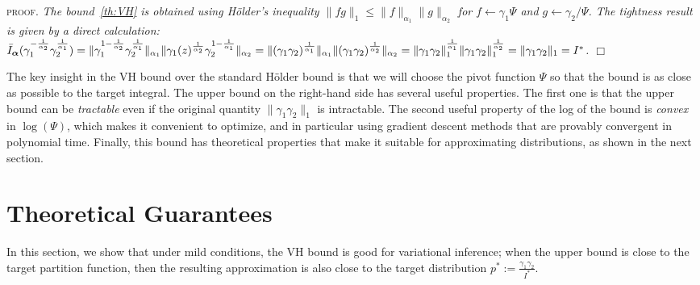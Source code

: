 \documentclass{article} %
\newcommand{\Holder}{H\"older\xspace}
\def\z{z}
\def\proba{p}
\newenvironment{proof}{\textsc{proof.}\it}{\hfill{$\Box$}}
\begin{document}
\begin{proof}
The bound~\eqref{th:VH} is obtained using \Holder's inequality $\|fg\|_1\le\|f\|_{\alpha_1}\|g\|_{\alpha_2}$ for $f\leftarrow \gamma_1\Psi$ and $g\leftarrow \gamma_2/\Psi$.
The tightness result is given by a direct calculation:
{\small
$ \bar I_\balpha( \gamma_1^{-\frac {1}{\alpha_2}}  \gamma_2^{\frac{1} {\alpha_1}}) = \|\gamma_1^{1-\frac {1}{\alpha_2}} \gamma_2^{\frac{1} {\alpha_1}}\|_{\alpha_1}\|\gamma_1(\z)^{\frac{1} {\alpha_2}}\gamma_2^{1-\frac {1}{\alpha_1}} \|_{\alpha_2}=\|(\gamma_1\gamma_2)^{\frac {1}{\alpha_1}}\|_{\alpha_1}\|(\gamma_1\gamma_2)^{\frac {1}{\alpha_2}}\|_{\alpha_2}
=\|\gamma_1\gamma_2\|_1^{\frac {1}{\alpha_1}} \|\gamma_1\gamma_2\|_1^{\frac {1}{\alpha_2}} =  \|\gamma_1\gamma_2\|_1=I^*$.
}
\end{proof}

The key insight in the VH bound over the standard \Holder bound 
is that we will choose the pivot function $\Psi$ so that the bound is as close as possible to the target integral.
The upper bound on the right-hand side has several useful properties. The first one is that the upper bound 
can be \emph{tractable} even if the original quantity $\|\gamma_1\gamma_2\|_1$ is intractable. 
The second useful property of the log of the bound is \emph{convex} in $\log(\Psi)$, which makes it 
convenient to optimize, and in particular using gradient descent methods that are
provably convergent in polynomial time. Finally, this bound has theoretical properties that make it 
suitable for approximating distributions, as shown in the next section.





\section{Theoretical Guarantees}
In this section, we show that under mild conditions, the VH bound is good for variational inference; 
when the upper bound is close to the target partition function, then the resulting approximation
is also close to the target distribution $\proba^* :=\frac{\gamma_1\gamma_2}{I^*} $.
\end{document}
